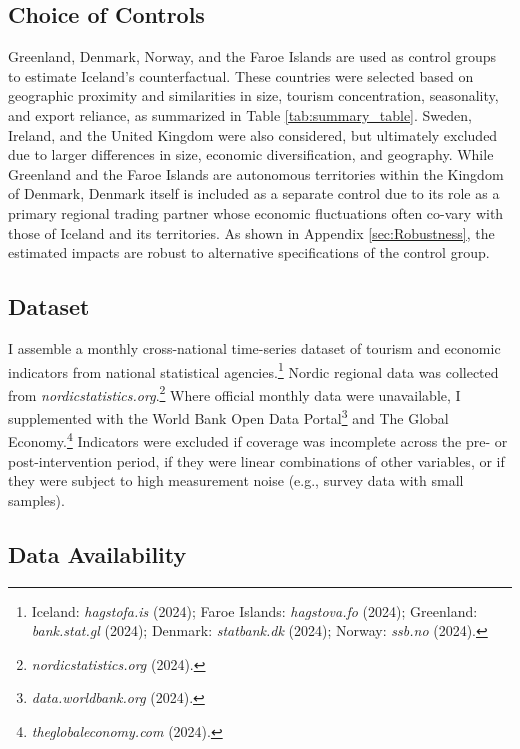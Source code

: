 \documentclass[12pt]{article}
\begin{document}
\subsection{Choice of Controls} 
Greenland, Denmark, Norway, and the Faroe Islands are used as control groups to estimate Iceland’s counterfactual. These countries were selected based on geographic proximity and similarities in size, tourism concentration, seasonality, and export reliance, as summarized in Table \ref{tab:summary_table}. Sweden, Ireland, and the United Kingdom were also considered, but ultimately excluded due to larger differences in size, economic diversification, and geography. While Greenland and the Faroe Islands are autonomous territories within the Kingdom of Denmark, Denmark itself is included as a separate control due to its role as a primary regional trading partner whose economic fluctuations often co-vary with those of Iceland and its territories. As shown in Appendix \ref{sec:Robustness}, the estimated impacts are robust to alternative specifications of the control group.


\subsection{Dataset}

I assemble a monthly cross-national time-series dataset of tourism and economic indicators from national statistical agencies.\footnote{Iceland: \textit{hagstofa.is} (2024); Faroe Islands: \textit{hagstova.fo} (2024); Greenland: \textit{bank.stat.gl} (2024); Denmark: \textit{statbank.dk} (2024); Norway: \textit{ssb.no} (2024).} Nordic regional data was collected from \textit{nordicstatistics.org}.\footnote{\textit{nordicstatistics.org} (2024).} Where official monthly data were unavailable, I supplemented with the World Bank Open Data Portal\footnote{\textit{data.worldbank.org} (2024).} and The Global Economy.\footnote{\textit{theglobaleconomy.com} (2024).} Indicators were excluded if coverage was incomplete across the pre- or post-intervention period, if they were linear combinations of other variables, or if they were subject to high measurement noise (e.g., survey data with small samples).  


\subsection{Data Availability}\label{sec:Data Availability}
\end{document}
